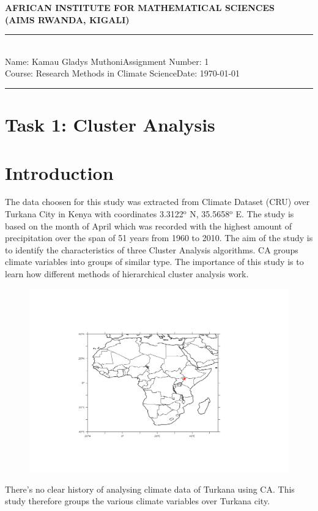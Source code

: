 \documentclass[12pt,a4paper]{article}
\newcommand{\student}{Kamau Gladys Muthoni}
\newcommand{\course}{Research Methods in Climate Science}
\newcommand{\assignment}{1}
\begin{document}
\thispagestyle{empty}
\begin{center}
\textbf{AFRICAN INSTITUTE FOR MATHEMATICAL SCIENCES \\[0.5cm]
(AIMS RWANDA, KIGALI)}
\vspace{1.0cm}
\end{center}

\noindent
\rule{17cm}{0.2cm}\\[0.3cm]
Name: \student \hfill Assignment Number: \assignment\\[0.1cm]
Course: \course \hfill Date: \today\\
\rule{17cm}{0.05cm}
\vspace{1.0cm}

\section{Task 1: Cluster Analysis}
\section{Introduction}
The data choosen for this study was extracted from Climate Dataset (CRU) over Turkana City in Kenya with coordinates 3.3122$^\text{o}$ N, 35.5658$^\text{o}$ E. 
The study is based on the month of April which was recorded with the highest amount of precipitation over the span of 51 years from 1960 to 2010. The aim of the study is to identify the characteristics of three Cluster Analysis algorithms. CA groups climate variables into groups of similar type. The importance of this study is to learn how different methods of hierarchical cluster analysis work. 

\begin{figure}[h]
	\centering
	\includegraphics[width=0.8\linewidth]{Turkana}
	\caption{}
	\label{fig:turkana}
\end{figure}
\noindent There's no clear history of analysing climate data of Turkana using CA. This study therefore groups the various climate variables over Turkana city.\\
\end{document}
